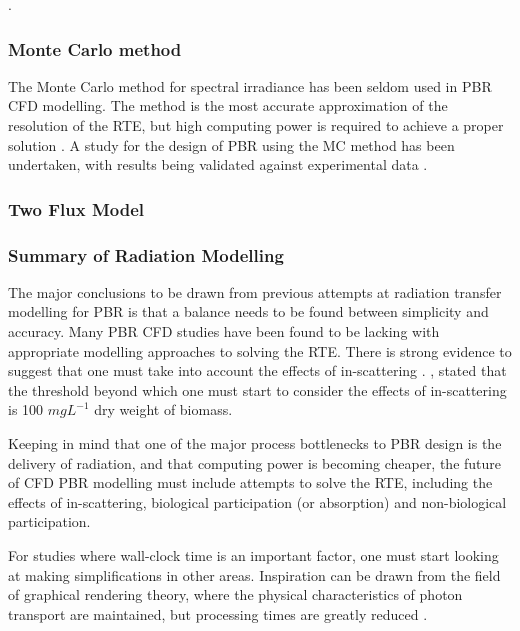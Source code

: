 \cite{Amini2016,Li2016,Casado2017,Lee2014}. 

\subsubsection{Monte Carlo method}
The Monte Carlo method for spectral irradiance has been seldom used in PBR CFD modelling. The method is the most accurate approximation of the resolution of the RTE, but high computing power is required to achieve a proper solution \cite{Kong2014}. A study for the design of PBR using the MC method has been undertaken, with results being validated against experimental data \cite{Heinrich2012}.



\subsubsection{Two Flux Model}
\cite{Pottier2005,Pruvost2008,Pilon2011,Perner-Nochta2007a}


\subsubsection{Summary of Radiation Modelling}
The major conclusions to be drawn from previous attempts at radiation transfer modelling for PBR is that a balance needs to be found between simplicity and accuracy. Many PBR CFD studies have been found to be lacking with appropriate modelling approaches to solving the RTE. There is strong evidence to suggest that one must take into account the effects of in-scattering \cite{Heinrich2012,Kong2014,Modest2003,Krishnamoorthy2014,Lee2014,Gao2016}. \cite{Heinrich2012}, stated that the threshold beyond which one must start to consider the effects of in-scattering is 100 $mg L^{-1}$ dry weight of biomass. 


Keeping in mind that one of the major process bottlenecks to PBR design is the delivery of radiation, and that computing power is becoming cheaper, the future of CFD PBR modelling must include attempts to solve the RTE, including the effects of in-scattering, biological participation (or absorption) and non-biological participation. 


For studies where wall-clock time is an important factor, one must start looking at making simplifications in other areas. Inspiration can be drawn from the field of graphical rendering theory, where the physical characteristics of photon transport are maintained, but processing times are greatly reduced \cite{Jarosz2008}.


